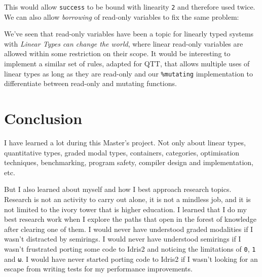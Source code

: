 \documentclass[
]{article}
\newenvironment{Shaded}{}{}
\newcommand{\CommentTok}[1]{\textcolor[rgb]{0.38,0.63,0.69}{\textit{#1}}}
\newcommand{\DataTypeTok}[1]{\textcolor[rgb]{0.56,0.13,0.00}{#1}}
\newcommand{\FunctionTok}[1]{\textcolor[rgb]{0.02,0.16,0.49}{#1}}
\newcommand{\KeywordTok}[1]{\textcolor[rgb]{0.00,0.44,0.13}{\textbf{#1}}}
\newcommand{\NormalTok}[1]{#1}
\newcommand{\OperatorTok}[1]{\textcolor[rgb]{0.40,0.40,0.40}{#1}}
\newcommand{\OtherTok}[1]{\textcolor[rgb]{0.00,0.44,0.13}{#1}}
\newcommand{\StringTok}[1]{\textcolor[rgb]{0.25,0.44,0.63}{#1}}
\begin{document}
This would allow \texttt{success} to be bound with linearity \texttt{2}
and therefore used twice. We can also allow \emph{borrowing} of
read-only variables to fix the same problem:

\begin{Shaded}
\end{Shaded}

We've seen that read-only variables have been a topic for linearly typed
systems with \emph{Linear Types can change the
world}\cite{linear_types_update}, where linear read-only variables are
allowed within some restriction on their scope. It would be interesting
to implement a similar set of rules, adapted for QTT, that allows
multiple uses of linear types as long as they are read-only and our
\texttt{\%mutating} implementation to differentiate between read-only
and mutating functions.

\newpage

\hypertarget{conclusion}{%
\section{Conclusion}\label{conclusion}}

I have learned a lot during this Master's project. Not only about linear
types, quantitative types, graded modal types, containers, categories,
optimisation techniques, benchmarking, program safety, compiler design
and implementation, etc.

But I also learned about myself and how I best approach research topics.
Research is not an activity to carry out alone, it is not a mindless
job, and it is not limited to the ivory tower that is higher education.
I learned that I do my best research work when I explore the paths that
open in the forest of knowledge after clearing one of them. I would
never have understood graded modalities if I wasn't distracted by
semirings. I would never have understood semirings if I wasn't
frustrated porting some code to Idris2 and noticing the limitations of
\texttt{0}, \texttt{1} and \texttt{ω}. I would have never started
porting code to Idris2 if I wasn't looking for an escape from writing
tests for my performance improvements.
\end{document}
